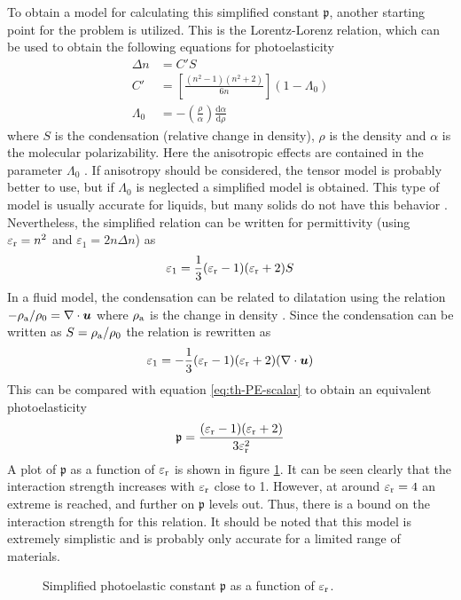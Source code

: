 \documentclass[11pt,twoside]{eitExjobb}
\begin{document}
	To obtain a model for calculating this simplified constant $\mathfrak{p}$, another starting point for the problem is utilized. This is the Lorentz-Lorenz relation, which can be used to obtain the following equations for photoelasticity \cite{Korpel1988}
	\begin{align*}
		\Delta n &= C' S \\
		C' &= \left[ \frac{(n^2-1)(n^2+2)}{6n} \right](1-\Lambda_0) \\
		\Lambda_0 &= -\left( \frac{\rho}{\alpha} \right) \frac{\mathrm{d} \alpha}{\mathrm{d} \rho}
	\end{align*}
	where $S$ is the condensation (relative change in density), $\rho$ is the density and $\alpha$ is the molecular polarizability. Here the anisotropic effects are contained in the parameter $\Lambda_0$ \cite{Korpel1988}. If anisotropy should be considered, the tensor model is probably better to use, but if $\Lambda_0$ is neglected a simplified model is obtained. This type of model is usually accurate for liquids, but many solids do not have this behavior \cite{Korpel1988}. Nevertheless, the simplified relation can be written for permittivity (using $\varepsilon_{\mathrm{r}} = n^2$ and $\varepsilon_1 = 2n \Delta n$) as
	\begin{equation*}
		\varepsilon_1 = \frac{1}{3} (\varepsilon_{\mathrm{r}} - 1)(\varepsilon_{\mathrm{r}} + 2) S
	\end{equation*}
	In a fluid model, the condensation can be related to dilatation using the relation $-\rho_{\mathrm{a}}/\rho_0 = \nabla \cdot \bm{u}$ where $\rho_{\mathrm{a}}$ is the change in density \cite{Kaufman2000}. Since the condensation can be written as $S = \rho_{\mathrm{a}}/\rho_0$ \cite{Korpel1988} the relation is rewritten as
	\begin{equation*}
		\varepsilon_1 = -\frac{1}{3} (\varepsilon_{\mathrm{r}} - 1)(\varepsilon_{\mathrm{r}} + 2) (\nabla \cdot \bm{u})
	\end{equation*}
	This can be compared with equation \eqref{eq:th-PE-scalar} to obtain an equivalent photoelasticity
	\begin{equation}
		\mathfrak{p} = \frac{(\varepsilon_{\mathrm{r}} - 1)(\varepsilon_{\mathrm{r}} + 2)}{3\varepsilon_{\mathrm{r}}^2}
		\label{eq:th-PE-liquid-model}
	\end{equation}
	A plot of $\mathfrak{p}$ as a function of $\varepsilon_{\mathrm{r}}$ is shown in figure \ref{fig:photoelastic-liquid}. It can be seen clearly that the interaction strength increases with $\varepsilon_{\mathrm{r}}$ close to 1. However, at around $\varepsilon_{\mathrm{r}} = 4$ an extreme is reached, and further on $\mathfrak{p}$ levels out. Thus, there is a bound on the interaction strength for this relation. It should be noted that this model is extremely simplistic and is probably only accurate for a limited range of materials.
	\begin{figure}[h]
		\centering
		\resizebox{\textwidth}{!}{
			
		}
		\caption{\label{fig:photoelastic-liquid} Simplified photoelastic constant $\mathfrak{p}$ as a function of $\varepsilon_{\mathrm{r}}$.}
	\end{figure}
	
\end{document}
